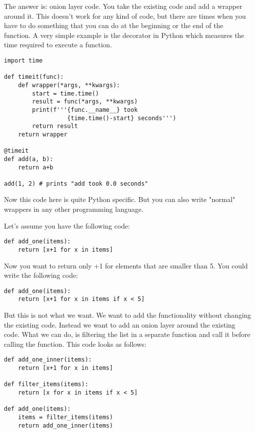 The answer is: onion layer code. You take the existing code and add a wrapper around it. This doesn't work for any kind of code, but there are times when you have to do something that you can do at the beginning or the end of the function. A very simple example is the \code{\@timeit} decorator in Python which measures the time required to execute a function.

\begin{programcode}{}
\begin{verbatim}
import time

def timeit(func):
    def wrapper(*args, **kwargs):
        start = time.time()
        result = func(*args, **kwargs)
        print(f'''{func.__name__} took 
                  {time.time()-start} seconds''')
        return result
    return wrapper
    
@timeit
def add(a, b):
    return a+b

add(1, 2) # prints "add took 0.0 seconds"
\end{verbatim}
\end{programcode}

Now this code here is quite Python specific. But you can also write "normal" wrappers in any other programming language.

Let's assume you have the following code:

\begin{programcode}{}
\begin{verbatim}
def add_one(items):
    return [x+1 for x in items]
\end{verbatim}
\end{programcode}

Now you want to return only +1 for elements that are smaller than 5. You could write the following code:

\begin{programcode}{}
\begin{verbatim}
def add_one(items):
    return [x+1 for x in items if x < 5]
\end{verbatim}
\end{programcode}

But this is not what we want. We want to add the functionality without changing the existing code. Instead we want to add an onion layer around the existing code. What we can do, is filtering the list in a separate function and call it before calling the  function. This code looks as follows:

\begin{programcode}{}
\begin{verbatim}
def add_one_inner(items):
    return [x+1 for x in items]

def filter_items(items):
    return [x for x in items if x < 5]

def add_one(items):
    items = filter_items(items)
    return add_one_inner(items)
\end{verbatim}
\end{programcode}

